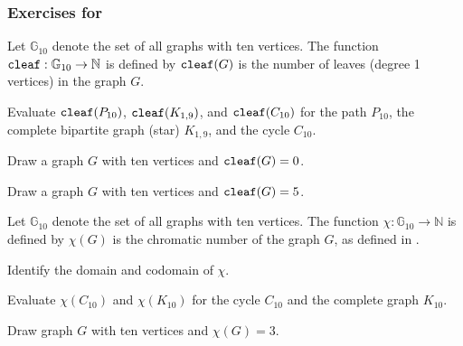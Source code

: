 \subsubsection*{Exercises for  \subfngraphs}

\begin{exer}[\exerP] %
\label{exer_count_leaf_function}
    Let $\mathbb{G}_{10}$ denote the set of all graphs with ten vertices.  The function $\texttt{cleaf}: \mathbb{G}_{10} \to \mathbb{N}$ is defined by $\texttt{cleaf}(G)$ is the number of leaves (degree 1 vertices) in the graph $G$.
        \begin{exerpart}
            \item Evaluate $\texttt{cleaf}(P_{10})$, $\texttt{cleaf}(K_{1,9})$, and $\texttt{cleaf}(C_{10})$ for the path $P_{10}$, the complete bipartite graph (star) $K_{1,9}$, and the cycle $C_{10}$.
            \item Draw a graph $G$ with ten vertices and $\texttt{cleaf}(G)=0$.
            \item Draw a graph $G$ with ten vertices and $\texttt{cleaf}(G)=5$.
        \end{exerpart}         
\end{exer}

\begin{exer}[\exerP] %
\label{exer_chromatic_number_function}
    Let $\mathbb{G}_{10}$ denote the set of all graphs with ten vertices. The function $\chi: \mathbb{G}_{10} \to \mathbb{N}$ is defined by $\chi(G)$ is the chromatic number of the graph $G$, as defined in . 
        \begin{exerpart}
            \item Identify the domain and codomain of $\chi$.
            \item Evaluate $\chi(C_{10})$ and $\chi(K_{10})$ for the cycle $C_{10}$ and the complete graph $K_{10}$.
            \item Draw graph $G$ with ten vertices and $\chi(G)=3$. 
        \end{exerpart}   
\end{exer}

